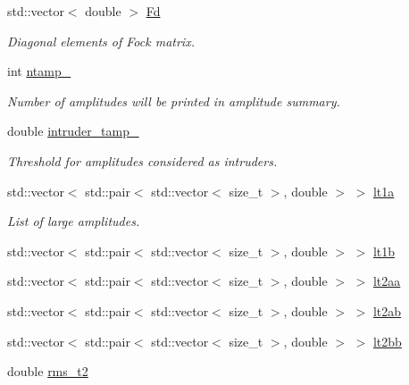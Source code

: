 \begin{DoxyCompactItemize}
\item 
std\+::vector$<$ double $>$ \mbox{\hyperlink{classforte_1_1_m_r_d_s_r_g___s_o_a86e8af5d9ccb5438d8e1f08bc8c0687f}{Fd}}
\begin{DoxyCompactList}\small\item\em Diagonal elements of Fock matrix. \end{DoxyCompactList}\item 
int \mbox{\hyperlink{classforte_1_1_m_r_d_s_r_g___s_o_ac783faa1c1956c5a6f3e75b7a7b93fe2}{ntamp\+\_\+}}
\begin{DoxyCompactList}\small\item\em Number of amplitudes will be printed in amplitude summary. \end{DoxyCompactList}\item 
double \mbox{\hyperlink{classforte_1_1_m_r_d_s_r_g___s_o_a90cc4935a2eda5d9e142e0b07e8194e5}{intruder\+\_\+tamp\+\_\+}}
\begin{DoxyCompactList}\small\item\em Threshold for amplitudes considered as intruders. \end{DoxyCompactList}\item 
std\+::vector$<$ std\+::pair$<$ std\+::vector$<$ size\+\_\+t $>$, double $>$ $>$ \mbox{\hyperlink{classforte_1_1_m_r_d_s_r_g___s_o_a8b12270d84f14e9cde02ae23586d4565}{lt1a}}
\begin{DoxyCompactList}\small\item\em List of large amplitudes. \end{DoxyCompactList}\item 
std\+::vector$<$ std\+::pair$<$ std\+::vector$<$ size\+\_\+t $>$, double $>$ $>$ \mbox{\hyperlink{classforte_1_1_m_r_d_s_r_g___s_o_a29ee665d80e40b21e4db4b2bfa607fd3}{lt1b}}
\item 
std\+::vector$<$ std\+::pair$<$ std\+::vector$<$ size\+\_\+t $>$, double $>$ $>$ \mbox{\hyperlink{classforte_1_1_m_r_d_s_r_g___s_o_abc932ff2377529cc06c60b5169310728}{lt2aa}}
\item 
std\+::vector$<$ std\+::pair$<$ std\+::vector$<$ size\+\_\+t $>$, double $>$ $>$ \mbox{\hyperlink{classforte_1_1_m_r_d_s_r_g___s_o_a75fa4b096a1fa0aea52115c45e118f90}{lt2ab}}
\item 
std\+::vector$<$ std\+::pair$<$ std\+::vector$<$ size\+\_\+t $>$, double $>$ $>$ \mbox{\hyperlink{classforte_1_1_m_r_d_s_r_g___s_o_a09f54e67392674dea181aa8aa529ea99}{lt2bb}}
\item 
double \mbox{\hyperlink{classforte_1_1_m_r_d_s_r_g___s_o_a8d4ef17610b30d9f81c014777828ad83}{rms\+\_\+t2}}

\end{DoxyCompactItemize}
